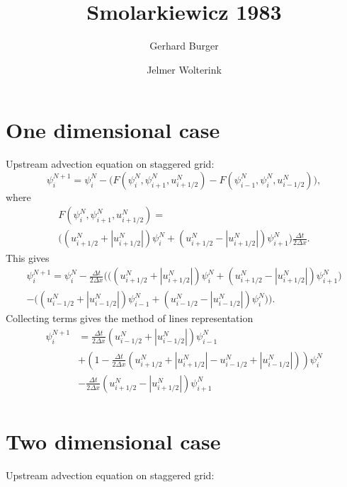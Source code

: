 \documentclass[12pt, a4paper]{article}
\author{Gerhard Burger \and Jelmer Wolterink}
\title{Smolarkiewicz 1983}
\newcommand{\abs}[1]{\left\lvert#1\right\rvert}
\begin{document}
\maketitle

\section*{One dimensional case}

Upstream advection equation on staggered grid:
\begin{equation}
 \psi_i^{N+1} = \psi_i^N - \Big( F \left( \psi_i^N,\psi_{i+1}^N,u_{i+1/2}^N\right) 
-F \left( \psi_{i-1}^N,\psi_{i}^N,u_{i-1/2}^N\right) \Big),
\end{equation}
where
\begin{multline}
F \left( \psi_i^N,\psi_{i+1}^N,u_{i+1/2}^N\right) =\\ 
\Big( \left( u_{i+1/2}^N + \abs{u_{i+1/2}^N} \right) \psi_i^N 
+ \left( u_{i+1/2}^N - \abs{u_{i+1/2}^N} \right) \psi_{i+1}^N \Big)
\frac{\Delta t}{2 \Delta x}.
\end{multline}
This gives
\begin{multline}
\psi_i^{N+1} = \psi_i^N - \frac{\Delta t}{2 \Delta x} \bigg( \Big( \left( u_{i+1/2}^N + \abs{u_{i+1/2}^N} \right) \psi_i^N 
+ \left( u_{i+1/2}^N - \abs{u_{i+1/2}^N} \right) \psi_{i+1}^N \Big)
\\
- \Big( \left( u_{i-1/2}^N + \abs{u_{i-1/2}^N} \right) \psi_{i-1}^N 
+ \left( u_{i-1/2}^N - \abs{u_{i-1/2}^N} \right) \psi_{i}^N \Big) \bigg).
\end{multline}
Collecting terms gives the method of lines representation
\begin{equation}
\begin{split}
\psi_i^{N+1} &= 
\frac{\Delta t}{2 \Delta x} \left( u_{i-1/2}^N + \abs{u_{i-1/2}^N} \right) \psi_{i-1}^N\\
&+ \left(1 - \frac{\Delta t}{2 \Delta x} \left( u_{i+1/2}^N + \abs{u_{i+1/2}^N} - u_{i-1/2}^N + \abs{u_{i-1/2}^N} \right) \right) \psi_i^N\\ 
&-\frac{\Delta t}{2 \Delta x} \left( u_{i+1/2}^N - \abs{u_{i+1/2}^N} \right) \psi_{i+1}^N\\
\end{split}
\end{equation}

\section*{Two dimensional case}
Upstream advection equation on staggered grid:
\end{document}
